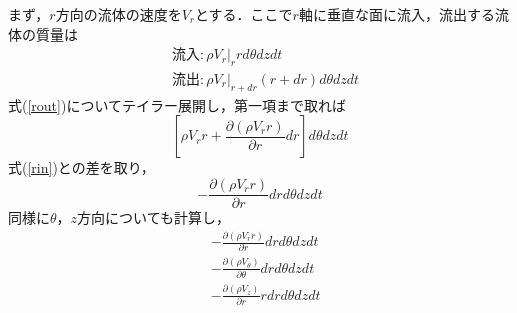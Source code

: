 \documentclass{jsarticle}
\newcommand{\pfrac}[2]{\frac{\partial{}{#1}}{\partial{}{#2}}}
\begin{document}
まず，$r$方向の流体の速度を$V_r$とする．ここで$r$軸に垂直な面に流入，流出する流体の質量は
\begin{align}
  &流入: \rho{}V_r|_{r}rd\theta{}dzdt\label{rin}\\
  &流出: \rho{}V_r|_{r+dr}(r+dr)d\theta{}dzdt\label{rout}
\end{align}
式(\ref{rout})についてテイラー展開し，第一項まで取れば
\begin{equation}
  \left[\rho{}V_rr+\pfrac{(\rho{}V_rr)}{r}dr\right]d\theta{}dzdt
\end{equation}
式(\ref{rin})との差を取り，
\begin{equation}
  -\pfrac{(\rho{}V_rr)}{r}drd\theta{}dzdt
\end{equation}
同様に$\theta{}$，$z$方向についても計算し，
\begin{align}
  &-\pfrac{(\rho{}V_rr)}{r}drd\theta{}dzdt\\
  &-\pfrac{(\rho{}V_\theta{})}{\theta{}}drd\theta{}dzdt\\
  &-\pfrac{(\rho{}V_z)}{r}rdrd\theta{}dzdt
\end{align}
\end{document}
